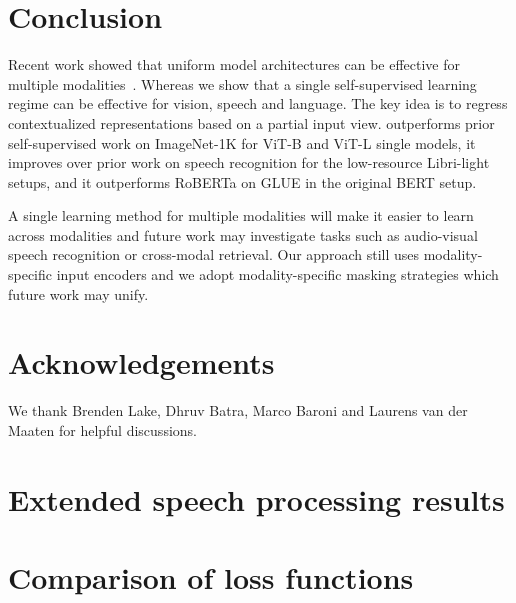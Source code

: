 \documentclass[nohyperref]{article}
\theoremstyle{plain}
\theoremstyle{definition}
\theoremstyle{remark}
\begin{document}
\section{Conclusion}

Recent work showed that uniform model architectures can be effective for multiple modalities~\citep{jaegle2021perceiver}.
Whereas we show that a single self-supervised learning regime can be effective for vision, speech and language.
The key idea is to regress contextualized representations based on a partial input view.
\name{} outperforms prior self-supervised work on ImageNet-1K for ViT-B and ViT-L single models, it improves over prior work on speech recognition for the low-resource Libri-light setups, and it outperforms RoBERTa on GLUE in the original BERT setup.

A single learning method for multiple modalities will make it easier to learn across modalities and future work may investigate tasks such as audio-visual speech recognition or cross-modal retrieval.
Our approach still uses modality-specific input encoders and we adopt modality-specific masking strategies which future work may unify.

\section*{Acknowledgements}

We thank Brenden Lake, Dhruv Batra, Marco Baroni and Laurens van der Maaten for helpful discussions. 






\newpage
\appendix
\onecolumn
\section{Extended speech processing results}

\insertLLtableApp


\section{Comparison of loss functions}
\end{document}

